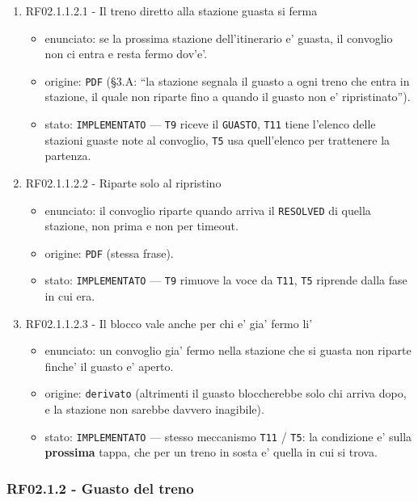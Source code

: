 \documentclass[11pt]{article}
\begin{document}
\begin{enumerate}
\begin{enumerate}
\item RF02.1.1.2.1 - Il treno diretto alla stazione guasta si ferma
\label{sec:orge1d66f7}
\begin{itemize}
\item enunciato: se la prossima stazione dell'itinerario e' guasta, il convoglio non ci entra e resta
fermo dov'e'.
\item origine: \texttt{PDF} (§3.A: ``la stazione segnala il guasto a ogni treno che entra in stazione, il quale
non riparte fino a quando il guasto non e' ripristinato'').
\item stato: \texttt{IMPLEMENTATO} — \texttt{T9} riceve il \texttt{GUASTO}, \texttt{T11} tiene l'elenco delle stazioni guaste note
al convoglio, \texttt{T5} usa quell'elenco per trattenere la partenza.
\end{itemize}
\item RF02.1.1.2.2 - Riparte solo al ripristino
\label{sec:org6d3c4b8}
\begin{itemize}
\item enunciato: il convoglio riparte quando arriva il \texttt{RESOLVED} di quella stazione, non prima e non
per timeout.
\item origine: \texttt{PDF} (stessa frase).
\item stato: \texttt{IMPLEMENTATO} — \texttt{T9} rimuove la voce da \texttt{T11}, \texttt{T5} riprende dalla fase in cui era.
\end{itemize}
\item RF02.1.1.2.3 - Il blocco vale anche per chi e' gia' fermo li'
\label{sec:org0ff90a0}
\begin{itemize}
\item enunciato: un convoglio gia' fermo nella stazione che si guasta non riparte finche' il guasto e'
aperto.
\item origine: \texttt{derivato} (altrimenti il guasto bloccherebbe solo chi arriva dopo, e la stazione non
sarebbe davvero inagibile).
\item stato: \texttt{IMPLEMENTATO} — stesso meccanismo \texttt{T11} / \texttt{T5}: la condizione e' sulla \textbf{prossima} tappa,
che per un treno in sosta e' quella in cui si trova.
\end{itemize}
\end{enumerate}
\end{enumerate}
\subsubsection{RF02.1.2 - Guasto del treno}
\label{sec:orgbfe37e4}
\end{document}
